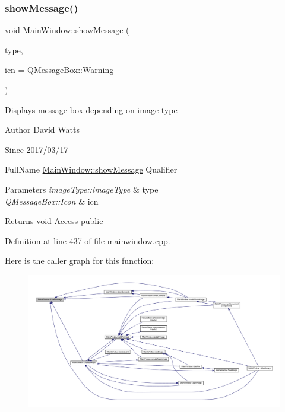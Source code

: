 \subsubsection{\texorpdfstring{show\+Message()}{showMessage()}\hspace{0.1cm}{\footnotesize\ttfamily [1/2]}}
{\footnotesize\ttfamily void Main\+Window\+::show\+Message (\begin{DoxyParamCaption}\item[{image\+Type\+::image\+Type}]{type,  }\item[{Q\+Message\+Box\+::\+Icon}]{icn = {\ttfamily QMessageBox\+:\+:Warning} }\end{DoxyParamCaption})}

Displays message box depending on image type

\begin{DoxyAuthor}{Author}
David Watts 
\end{DoxyAuthor}
\begin{DoxySince}{Since}
2017/03/17
\end{DoxySince}
Full\+Name \hyperlink{class_main_window_a280d25148ac076ca817d411372584ae5}{Main\+Window\+::show\+Message} Qualifier 
\begin{DoxyParams}{Parameters}
{\em image\+Type\+::image\+Type} & type \\
\hline
{\em Q\+Message\+Box\+::\+Icon} & icn \\
\hline
\end{DoxyParams}
\begin{DoxyReturn}{Returns}
void Access public 
\end{DoxyReturn}


Definition at line 437 of file mainwindow.\+cpp.

Here is the caller graph for this function\+:
\nopagebreak
\begin{figure}[H]
\begin{center}
\leavevmode
\includegraphics[width=350pt]{class_main_window_a280d25148ac076ca817d411372584ae5_icgraph}
\end{center}
\end{figure}
\mbox{\label{class_main_window_aebde68c58d77b71d20fa6816b751356e}} 
